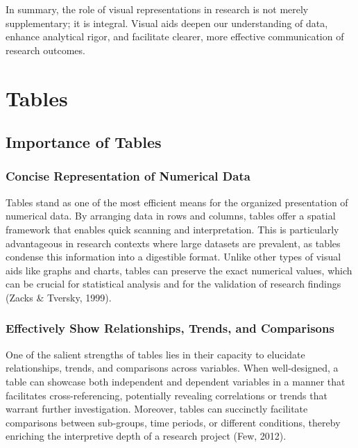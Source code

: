 \documentclass[
  b5paper]{book}
\begin{document}
In summary, the role of visual representations in research is not merely supplementary; it is integral. Visual aids deepen our understanding of data, enhance analytical rigor, and facilitate clearer, more effective communication of research outcomes.

\hypertarget{tables}{%
\section{Tables}\label{tables}}

\hypertarget{importance-of-tables}{%
\subsection{Importance of Tables}\label{importance-of-tables}}

\hypertarget{concise-representation-of-numerical-data}{%
\subsubsection{Concise Representation of Numerical Data}\label{concise-representation-of-numerical-data}}

Tables stand as one of the most efficient means for the organized presentation of numerical data. By arranging data in rows and columns, tables offer a spatial framework that enables quick scanning and interpretation. This is particularly advantageous in research contexts where large datasets are prevalent, as tables condense this information into a digestible format. Unlike other types of visual aids like graphs and charts, tables can preserve the exact numerical values, which can be crucial for statistical analysis and for the validation of research findings (Zacks \& Tversky, 1999).

\hypertarget{effectively-show-relationships-trends-and-comparisons}{%
\subsubsection{Effectively Show Relationships, Trends, and Comparisons}\label{effectively-show-relationships-trends-and-comparisons}}

One of the salient strengths of tables lies in their capacity to elucidate relationships, trends, and comparisons across variables. When well-designed, a table can showcase both independent and dependent variables in a manner that facilitates cross-referencing, potentially revealing correlations or trends that warrant further investigation. Moreover, tables can succinctly facilitate comparisons between sub-groups, time periods, or different conditions, thereby enriching the interpretive depth of a research project (Few, 2012).
\end{document}
